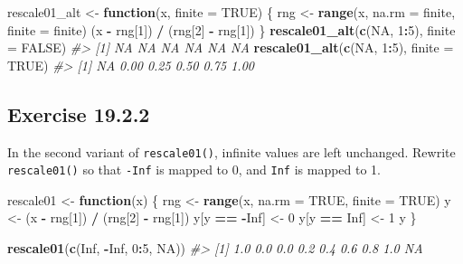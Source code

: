 \documentclass[]{book}
\newenvironment{Shaded}{\begin{snugshade}}{\end{snugshade}}
\newcommand{\CommentTok}[1]{\textcolor[rgb]{0.56,0.35,0.01}{\textit{#1}}}
\newcommand{\ControlFlowTok}[1]{\textcolor[rgb]{0.13,0.29,0.53}{\textbf{#1}}}
\newcommand{\DataTypeTok}[1]{\textcolor[rgb]{0.13,0.29,0.53}{#1}}
\newcommand{\DecValTok}[1]{\textcolor[rgb]{0.00,0.00,0.81}{#1}}
\newcommand{\KeywordTok}[1]{\textcolor[rgb]{0.13,0.29,0.53}{\textbf{#1}}}
\newcommand{\NormalTok}[1]{#1}
\newcommand{\OperatorTok}[1]{\textcolor[rgb]{0.81,0.36,0.00}{\textbf{#1}}}
\newcommand{\OtherTok}[1]{\textcolor[rgb]{0.56,0.35,0.01}{#1}}
\newcommand{\StringTok}[1]{\textcolor[rgb]{0.31,0.60,0.02}{#1}}
\theoremstyle{plain}
\theoremstyle{remark}
\theoremstyle{definition}
\theoremstyle{definition}
\theoremstyle{definition}
\theoremstyle{remark}
\begin{document}
\begin{Shaded}
\begin{Highlighting}[]
\NormalTok{rescale01_alt <-}\StringTok{ }\ControlFlowTok{function}\NormalTok{(x, }\DataTypeTok{finite =} \OtherTok{TRUE}\NormalTok{) \{}
\NormalTok{  rng <-}\StringTok{ }\KeywordTok{range}\NormalTok{(x, }\DataTypeTok{na.rm =}\NormalTok{ finite, }\DataTypeTok{finite =}\NormalTok{ finite)}
\NormalTok{  (x }\OperatorTok{-}\StringTok{ }\NormalTok{rng[}\DecValTok{1}\NormalTok{]) }\OperatorTok{/}\StringTok{ }\NormalTok{(rng[}\DecValTok{2}\NormalTok{] }\OperatorTok{-}\StringTok{ }\NormalTok{rng[}\DecValTok{1}\NormalTok{])}
\NormalTok{\}}
\KeywordTok{rescale01_alt}\NormalTok{(}\KeywordTok{c}\NormalTok{(}\OtherTok{NA}\NormalTok{, }\DecValTok{1}\OperatorTok{:}\DecValTok{5}\NormalTok{), }\DataTypeTok{finite =} \OtherTok{FALSE}\NormalTok{)}
\CommentTok{#> [1] NA NA NA NA NA NA}
\KeywordTok{rescale01_alt}\NormalTok{(}\KeywordTok{c}\NormalTok{(}\OtherTok{NA}\NormalTok{, }\DecValTok{1}\OperatorTok{:}\DecValTok{5}\NormalTok{), }\DataTypeTok{finite =} \OtherTok{TRUE}\NormalTok{)}
\CommentTok{#> [1]   NA 0.00 0.25 0.50 0.75 1.00}
\end{Highlighting}
\end{Shaded}

\hypertarget{exercise-19.2.2}{%
\subsection*{\texorpdfstring{Exercise
{19.2.2}}{Exercise 19.2.2}}\label{exercise-19.2.2}}

In the second variant of \texttt{rescale01()}, infinite values are left
unchanged. Rewrite \texttt{rescale01()} so that \texttt{-Inf} is mapped
to 0, and \texttt{Inf} is mapped to 1.

\begin{Shaded}
\begin{Highlighting}[]
\NormalTok{rescale01 <-}\StringTok{ }\ControlFlowTok{function}\NormalTok{(x) \{}
\NormalTok{  rng <-}\StringTok{ }\KeywordTok{range}\NormalTok{(x, }\DataTypeTok{na.rm =} \OtherTok{TRUE}\NormalTok{, }\DataTypeTok{finite =} \OtherTok{TRUE}\NormalTok{)}
\NormalTok{  y <-}\StringTok{ }\NormalTok{(x }\OperatorTok{-}\StringTok{ }\NormalTok{rng[}\DecValTok{1}\NormalTok{]) }\OperatorTok{/}\StringTok{ }\NormalTok{(rng[}\DecValTok{2}\NormalTok{] }\OperatorTok{-}\StringTok{ }\NormalTok{rng[}\DecValTok{1}\NormalTok{])}
\NormalTok{  y[y }\OperatorTok{==}\StringTok{ }\OperatorTok{-}\OtherTok{Inf}\NormalTok{] <-}\StringTok{ }\DecValTok{0}
\NormalTok{  y[y }\OperatorTok{==}\StringTok{ }\OtherTok{Inf}\NormalTok{] <-}\StringTok{ }\DecValTok{1}
\NormalTok{  y}
\NormalTok{\}}

\KeywordTok{rescale01}\NormalTok{(}\KeywordTok{c}\NormalTok{(}\OtherTok{Inf}\NormalTok{, }\OperatorTok{-}\OtherTok{Inf}\NormalTok{, }\DecValTok{0}\OperatorTok{:}\DecValTok{5}\NormalTok{, }\OtherTok{NA}\NormalTok{))}
\CommentTok{#> [1] 1.0 0.0 0.0 0.2 0.4 0.6 0.8 1.0  NA}
\end{Highlighting}
\end{Shaded}
\end{document}
